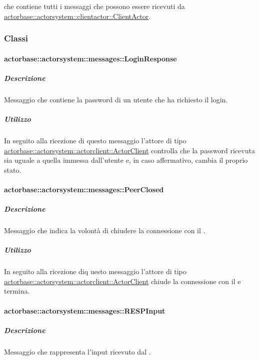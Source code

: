 \documentclass{scalatekids-article}
\begin{document}
 che contiene tutti i messaggi che possono essere ricevuti da
\hyperref[sec:actorbase::actorsystem::clientactor::ClientActor]{actorbase::actorsystem::clientactor::ClientActor}.

\subsubsection{Classi}

\paragraph{actorbase::actorsystem::messages::LoginResponse}
\label{sec:actorbase::actorsystem::messages::LoginResponse}

\subparagraph{Descrizione}

Messaggio che contiene la password di un utente che ha richiesto il login.

\subparagraph{Utilizzo}

In seguito alla ricezione di questo messaggio l'attore di tipo
\hyperref[sec:actorbase::actorsystem::actorclient::ActorClient]{actorbase::actorsystem::actorclient::ActorClient}
controlla che la password ricevuta sia uguale a quella immessa
dall'utente e, in caso affermativo, cambia il proprio stato.

\paragraph{actorbase::actorsystem::messages::PeerClosed}
\label{sec:actorbase::actorsystem::messages::PeerClosed}

\subparagraph{Descrizione}

Messaggio che indica la volontà di chiudere la connessione con il .

\subparagraph{Utilizzo}

In seguito alla ricezione diq uesto messaggio l'attore di tipo
\hyperref[sec:actorbase::actorsystem::actorclient::ActorClient]{actorbase::actorsystem::actorclient::ActorClient}
chiude la connessione con il  e termina.

\paragraph{actorbase::actorsystem::messages::RESPInput}
\label{sec:actorbase::actorsystem::messages::RESPInput}

\subparagraph{Descrizione}

Messaggio che rappresenta l'input ricevuto dal .
\end{document}
